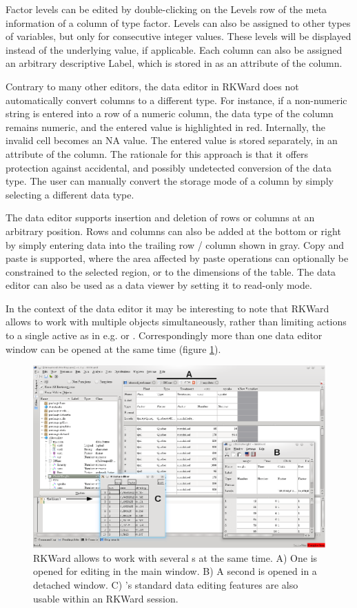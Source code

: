 Factor levels can be edited by double-clicking on the
Levels row of the meta information of a
column of type factor. Levels can also be assigned to other types of
variables, but only for consecutive integer values. These levels will
be displayed instead of the underlying value, if applicable. Each
column can also be assigned an arbitrary descriptive
Label, which is stored in
 as an attribute of the column.

Contrary to many other editors, the data editor in RKWard does not
automatically convert columns to a different type. For instance, if a
non-numeric string is entered into a row of a numeric column, the data
type of the column remains numeric, and the entered value is
highlighted in red. Internally, the invalid cell becomes an NA value.
The entered value is stored separately, in an attribute of the column.
The rationale for this approach is that it offers protection against
accidental, and possibly undetected conversion of the data type. The
user can manually convert the storage mode of a column by simply
selecting a different data type.

The data editor supports insertion and deletion of rows or columns at an
arbitrary position. Rows and columns can also be added at the bottom or
right by simply entering data into the trailing row / column shown in
gray. Copy and paste is supported, where the area affected by paste
operations can optionally be constrained to the selected region, or to
the dimensions of the table. The data editor can also be used as a data
viewer by setting it to read-only mode.

In the context of the data editor it may be interesting to note that
RKWard allows to work with multiple objects simultaneously, rather than
limiting actions to a single active  as in e.g.  or
. Correspondingly more than one data editor window can be opened
at the same time (figure \ref{fig:data_editors}).

\begin{figure}[htp]
 \centering
 \includegraphics{../figures/data_editors.png}
 \caption{RKWard allows to work with several s at the same time. A) One  is opened for editing in the 
 main window. B) A second  is opened in a detached window. C) 's standard data editing features are also
 usable within an RKWard session.}
 \label{fig:data_editors}
\end{figure}

